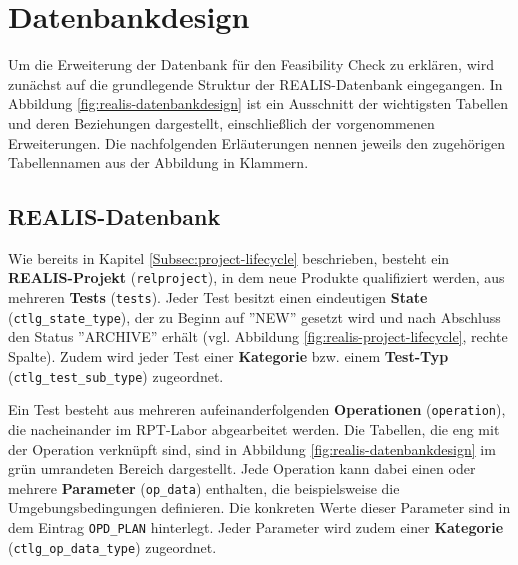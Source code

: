 \section{Datenbankdesign}
Um die Erweiterung der Datenbank für den Feasibility Check zu erklären, wird zunächst auf die grundlegende Struktur der REALIS-Datenbank eingegangen. In Abbildung \ref{fig:realis-datenbankdesign} ist ein Ausschnitt der wichtigsten Tabellen und deren Beziehungen dargestellt, einschließlich der vorgenommenen Erweiterungen. Die nachfolgenden Erläuterungen nennen jeweils den zugehörigen Tabellennamen aus der Abbildung in Klammern.

\subsection{REALIS-Datenbank}

Wie bereits in Kapitel \ref{Subsec:project-lifecycle} beschrieben, besteht ein \textbf{REALIS-Projekt} (\texttt{relproject}), in dem neue Produkte qualifiziert werden, aus mehreren \textbf{Tests} (\texttt{tests}). Jeder Test besitzt einen eindeutigen \textbf{State} (\texttt{ctlg\_state\_type}), der zu Beginn auf ''NEW'' gesetzt wird und nach Abschluss den Status ''ARCHIVE'' erhält (vgl. Abbildung \ref{fig:realis-project-lifecycle}, rechte Spalte). Zudem wird jeder Test einer \textbf{Kategorie} bzw. einem \textbf{Test-Typ} (\texttt{ctlg\_test\-\_sub\_type}) zugeordnet.

Ein Test besteht aus mehreren aufeinanderfolgenden \textbf{Operationen} (\texttt{operation}), die nacheinander im \gls{RPT}-Labor abgearbeitet werden. Die Tabellen, die eng mit der Operation verknüpft sind, sind in Abbildung \ref{fig:realis-datenbankdesign} im grün umrandeten Bereich dargestellt. Jede Operation kann dabei einen oder mehrere \textbf{Parameter} (\texttt{op\_data}) enthalten, die beispielsweise die Umgebungsbedingungen definieren. Die konkreten Werte dieser Parameter sind in dem Eintrag \texttt{OPD\_PLAN} hinterlegt. Jeder Parameter wird zudem einer \textbf{Kategorie} (\texttt{ctlg\_op\_\-data\_type}) zugeordnet.  


